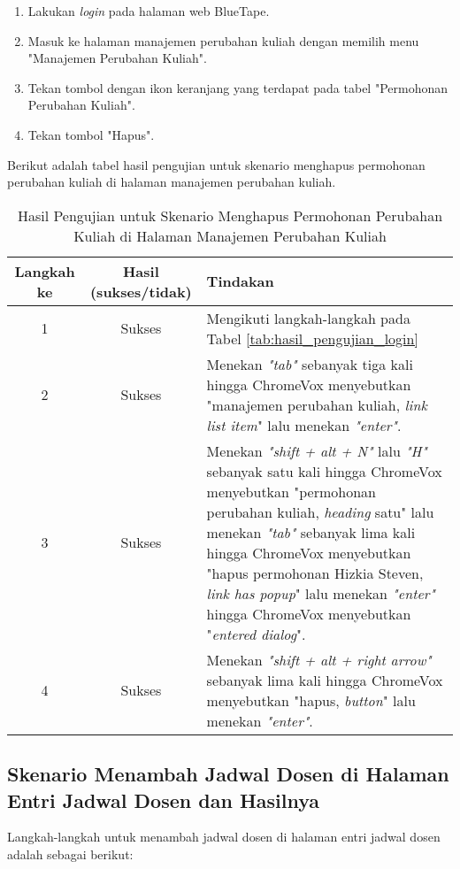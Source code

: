 \begin{enumerate}
    \item Lakukan \textit{login} pada halaman web BlueTape.
    \item Masuk ke halaman manajemen perubahan kuliah dengan memilih menu "Manajemen Perubahan Kuliah".
    \item Tekan tombol dengan ikon keranjang yang terdapat pada tabel "Permohonan Perubahan Kuliah".
    \item Tekan tombol "Hapus".
\end{enumerate}

Berikut adalah tabel hasil pengujian untuk skenario menghapus permohonan perubahan kuliah di halaman manajemen perubahan kuliah.

\begin{table}[H]
    \centering 
    \caption{Hasil Pengujian untuk Skenario Menghapus Permohonan Perubahan Kuliah di Halaman Manajemen Perubahan Kuliah}
    \label{tab:hasil_pengujian_menghapus_permohonan_perubahan_kuliah_di_halaman_manajemen_perubahan_kuliah}
    \begin{tabular}{|c|c|p{10cm}|}
        \toprule
        Langkah ke & Hasil (sukses/tidak) & Tindakan \\

        \midrule
        1 & Sukses & Mengikuti langkah-langkah pada Tabel \ref{tab:hasil_pengujian_login} \\
        2 & Sukses & Menekan \textit{"tab"} sebanyak tiga kali hingga ChromeVox menyebutkan "manajemen perubahan kuliah, \textit{link list item}" lalu menekan \textit{"enter"}. \\
        3 & Sukses & Menekan \textit{"shift + alt + N"} lalu \textit{"H"} sebanyak satu kali hingga ChromeVox menyebutkan "permohonan perubahan kuliah, \textit{heading} satu" lalu menekan \textit{"tab"} sebanyak lima kali hingga ChromeVox menyebutkan "hapus permohonan Hizkia Steven, \textit{link has popup}" lalu menekan \textit{"enter"} hingga ChromeVox menyebutkan "\textit{entered dialog}". \\
        4 & Sukses & Menekan \textit{"shift + alt + right arrow"} sebanyak lima kali hingga ChromeVox menyebutkan "hapus, \textit{button}" lalu menekan \textit{"enter"}. \\ 

        \bottomrule

    \end{tabular}
\end{table}

\subsection{Skenario Menambah Jadwal Dosen di Halaman Entri Jadwal Dosen dan Hasilnya}
\label{subsec:skenario_menambah_jadwal_dosen_di_halaman_entri_jadwal_dosen}
Langkah-langkah untuk menambah jadwal dosen di halaman entri jadwal dosen adalah sebagai berikut:

